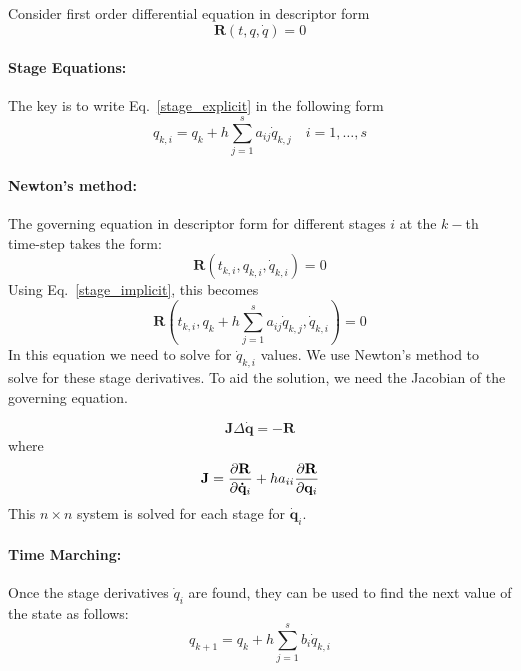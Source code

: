 \documentclass[pdftex,11pt,letter]{article}
\begin{document}
Consider first order differential equation in descriptor form
\begin{equation}
  \mathbf{R}(t, q, \dot{q}) = 0
\end{equation}

\paragraph{Stage Equations:}
The key is to write Eq.~\ref{stage_explicit} in the following form
\begin{equation}\label{stage_implicit}
  q_{k,i} = q_{k} + h \sum_{j=1}^s a_{ij} \dot{q}_{k,j} \quad i = 1,\ldots,s 
\end{equation}

\paragraph{Newton's method:}

The governing equation in descriptor form for different stages $i$ at the $k-$th time-step takes the form:
\begin{equation}
  \mathbf{R}\left(t_{k,i}, q_{k,i}, \dot{q}_{k,i}\right) = 0
\end{equation}
Using Eq.~\eqref{stage_implicit}, this becomes
\begin{equation}
  \mathbf{R}\left(t_{k,i}, q_k + h \sum_{j=1}^s a_{ij}\dot{q}_{k,j}, \dot{q}_{k,i}\right) = 0
\end{equation}
In this equation we need to solve for $\dot{q}_{k,i}$ values. We use
Newton's method to solve for these stage derivatives. To aid the
solution, we need the Jacobian of the governing equation.

\begin{equation}
 \mathbf{J} \Delta\mathbf{\dot{q}} = -\mathbf{R}
\end{equation}
where
\begin{equation}
  \mathbf{J} = \dfrac{\partial \mathbf{R}}{\partial \mathbf{\dot{q}}_{i}} + h a_{ii} \dfrac{\partial \mathbf{R}}{\partial \mathbf{q}_{i}}
\end{equation}
This $n \times n$  system is solved for each stage for $\mathbf{\dot{q}}_i$.

\paragraph{Time Marching:}

Once the stage derivatives $\dot{q}_{i}$ are found, they can be used
to find the next value of the state as follows:
\begin{equation}
  q_{k+1} = q_{k} +h \sum_{j=1}^s b_i \dot{q}_{k,i}
\end{equation}
\end{document}
